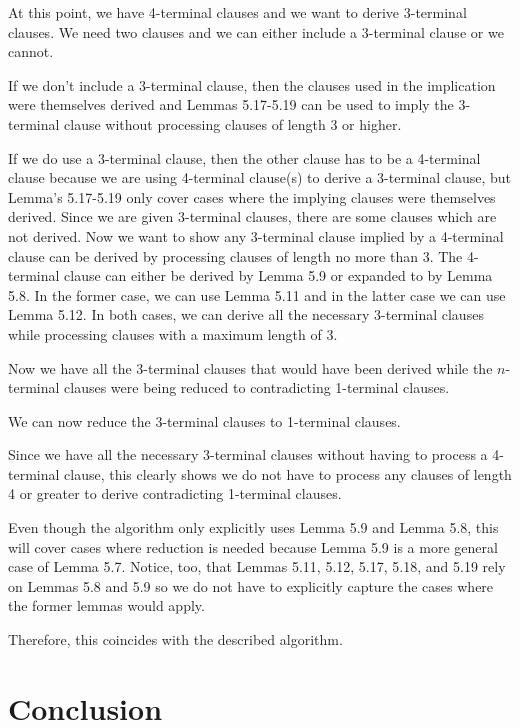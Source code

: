 \documentclass[manuscript]{acmart}
\begin{document}
    At this point, we have 4-terminal clauses and we want to derive 3-terminal
    clauses. We need two clauses and we can either include a 3-terminal clause
    or we cannot.

    If we don't include a 3-terminal clause, then the clauses used in the 
    implication were themselves derived and Lemmas 5.17-5.19 can be
    used to imply the 3-terminal clause without processing clauses
    of length 3 or higher.

    If we do use a 3-terminal clause, then the other clause has to be a
    4-terminal clause because we are using 4-terminal clause(s) to derive
    a 3-terminal clause,
    but Lemma's 5.17-5.19 only cover cases where the implying clauses were
    themselves derived. Since we are given 3-terminal clauses, there are some
    clauses which are not derived. Now we want to show any 3-terminal clause
    implied by a 4-terminal clause can be derived by processing clauses of length
    no more than 3. The 4-terminal clause can either be derived by Lemma 5.9 or
    expanded to by Lemma 5.8. In the former case, we can use Lemma 5.11 and in 
    the latter case we can use Lemma 5.12. In both cases, we can derive all the 
    necessary 3-terminal clauses while processing clauses with a maximum length
    of 3.

    Now we have all the 3-terminal clauses that would have been derived
    while the $n$-terminal clauses were being reduced to contradicting 1-terminal
    clauses.

    We can now reduce the 3-terminal clauses to 1-terminal clauses.

    Since we have all the necessary 3-terminal clauses without having
    to process a 4-terminal clause, this clearly shows we do not
    have to process any clauses of length 4 or greater to derive contradicting 1-terminal
    clauses.
    
    Even though the algorithm only explicitly uses Lemma 5.9 and Lemma 5.8, this will
    cover cases where reduction is needed because Lemma 5.9 is a more
    general case of Lemma 5.7. Notice, too, that Lemmas 5.11, 5.12, 5.17,
    5.18, and 5.19 rely on Lemmas 5.8 and 5.9 so we do not have to 
    explicitly capture the cases where the former lemmas would apply.

    Therefore, this coincides with the described algorithm.

    \section{Conclusion} 
\end{document}
